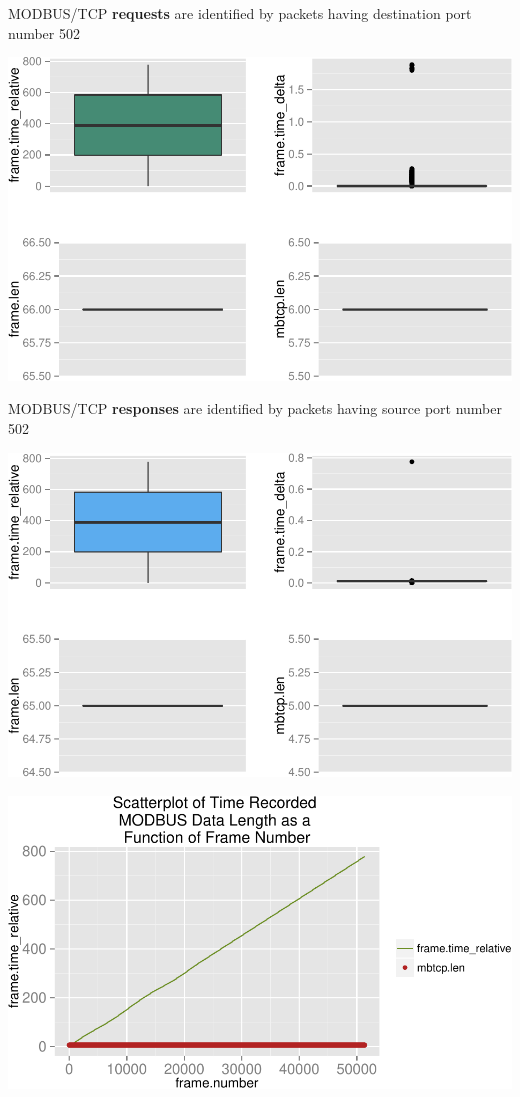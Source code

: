 \documentclass[]{article}
\begin{document}
MODBUS/TCP \textbf{requests} are identified by packets having
destination port number 502

\begin{center}\includegraphics{modbus_files/figure-latex/unnamed-chunk-13-1} \end{center}

\pagebreak

MODBUS/TCP \textbf{responses} are identified by packets having source
port number 502

\begin{center}\includegraphics{modbus_files/figure-latex/unnamed-chunk-15-1} \end{center}

\pagebreak

\includegraphics{modbus_files/figure-latex/unnamed-chunk-16-1.pdf}
\end{document}
